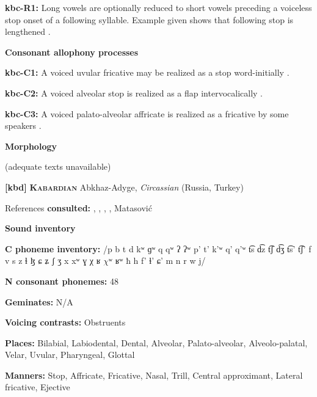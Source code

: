 \textbf{kbc-R1:} Long vowels are optionally reduced to short vowels preceding a voiceless stop onset of a following syllable. Example given shows that following stop is lengthened \citep[17]{Sandalo1997}.



\textbf{Consonant allophony processes}



\textbf{kbc-C1:} A voiced uvular fricative may be realized as a stop word-initially \citep[16]{Sandalo1997}.



\textbf{kbc-C2:} A voiced alveolar stop is realized as a flap intervocalically \citep[16]{Sandalo1997}.



\textbf{kbc-C3:} A voiced palato-alveolar affricate is realized as a fricative by some speakers \citep[15-16]{Sandalo1997}.



\textbf{Morphology}



(adequate texts unavailable)



\textbf{[kbd]}   \textbf{\textsc{Kabardian}}  Abkhaz-Adyge, \textit{Circassian} (Russia, Turkey)



References \textbf{consulted:} \citet{Applebaum2013}, \citet{Colarusso2006}, \citet{GordonApplebaum2010}, \citet{Kuipers1960}, Matasović 



\textbf{Sound inventory}



\textbf{C phoneme inventory:} /p b t d kʷ ɡʷ q qʷ ʔ ʔʷ p’ t’ k’ʷ q’ q’ʷ t͡s d͡z t͡ʃ d͡ʒ t͡s’ t͡ʃ’ f v s z ɬ ɮ ɕ ʑ ʃ ʒ x xʷ ɣ χ ʁ $\chi ʷ$ ʁʷ ħ h f' ɬ’ ɕ' m n r w j/



\textbf{N consonant phonemes:} 48



\textbf{Geminates:} N/A



\textbf{Voicing contrasts:} Obstruents



\textbf{Places:} Bilabial, Labiodental, Dental, Alveolar, Palato-alveolar, Alveolo-palatal, Velar, Uvular, Pharyngeal, Glottal



\textbf{Manners:} Stop, Affricate, Fricative, Nasal, Trill, Central approximant, Lateral fricative, Ejective



